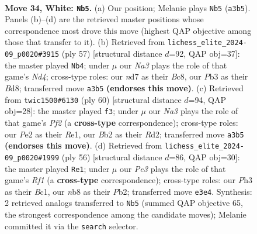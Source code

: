 \documentclass[11pt]{article}
\begin{document}
\clearpage

\begin{figure}[p]\centering
\begin{subfigure}{0.46\textwidth}\centering
\resizebox{\linewidth}{!}{%
\newchessgame
\chessboard[
  setfen={1nb5/1p1n2k1/r4p2/p2p2p1/1b4Pp/NP2P2P/PB2PK2/1R1B4 w - - 2 34},
  showmover=false,
  pgfstyle=straightmove, color=movearrow, markmove={a3-b5}
]}
\caption{}
\end{subfigure}\hfill
\begin{subfigure}{0.46\textwidth}\centering
\resizebox{\linewidth}{!}{%
\newchessgame
\chessboard[
  setfen={2bb1r1k/2p3np/3p4/pB1np1P1/P1P2p2/R4N1P/1B3P1K/6R1 b - - 0 29},
  showmover=false,
  pgfstyle=straightmove, color=movearrow, markmove={d5-b4}
]}
\caption{}
\end{subfigure}
\\[4pt]
\begin{subfigure}{0.46\textwidth}\centering
\resizebox{\linewidth}{!}{%
\newchessgame
\chessboard[
  setfen={3r4/2b2nk1/p2p1p2/4pBp1/Pp2P2r/4B3/1PPR1P1P/4R1K1 w - - 0 31},
  showmover=false,
  pgfstyle=straightmove, color=movearrow, markmove={f2-f3}
]}
\caption{}
\end{subfigure}\hfill
\begin{subfigure}{0.46\textwidth}\centering
\resizebox{\linewidth}{!}{%
\newchessgame
\chessboard[
  setfen={3rn3/p1p1b1k1/1p2bp2/6p1/P2PN2p/2PB4/1P4PP/2B2RK1 w - - 8 29},
  showmover=false,
  pgfstyle=straightmove, color=movearrow, markmove={f1-e1}
]}
\caption{}
\end{subfigure}
\caption{\textbf{Move 34, White: \texttt{Nb5}.} (a) Our position; Melanie plays \texttt{Nb5} (\texttt{a3b5}). Panels (b)--(d) are the retrieved master positions whose correspondence most drove this move (highest QAP objective among those that transfer to it). (b) Retrieved from \texttt{lichess\_elite\_2024-09\_p0020\#3915} (ply 57) [structural distance $d$=92, QAP obj=37]: the master played \texttt{Nb4}; under $\mu$ our \emph{Na3} plays the role of that game's \emph{Nd4}; cross-type roles: our \emph{n}d7 as their \emph{B}c8, our \emph{P}b3 as their \emph{B}d8; transferred move \texttt{a3b5} \textbf{(endorses this move)}. (c) Retrieved from \texttt{twic1500\#6130} (ply 60) [structural distance $d$=94, QAP obj=28]: the master played \texttt{f3}; under $\mu$ our \emph{Na3} plays the role of that game's \emph{Pf2} (a \textbf{cross-type} correspondence); cross-type roles: our \emph{P}e2 as their \emph{R}e1, our \emph{B}b2 as their \emph{R}d2; transferred move \texttt{a3b5} \textbf{(endorses this move)}. (d) Retrieved from \texttt{lichess\_elite\_2024-09\_p0020\#1999} (ply 56) [structural distance $d$=86, QAP obj=30]: the master played \texttt{Re1}; under $\mu$ our \emph{Pe3} plays the role of that game's \emph{Rf1} (a \textbf{cross-type} correspondence); cross-type roles: our \emph{P}h3 as their \emph{B}c1, our \emph{n}b8 as their \emph{P}b2; transferred move \texttt{e3e4}. Synthesis: 2 retrieved analogs transferred to \texttt{Nb5} (summed QAP objective 65, the strongest correspondence among the candidate moves); Melanie committed it via the \texttt{search} selector.}
\label{fig:thought-m66}
\end{figure}
\end{document}
